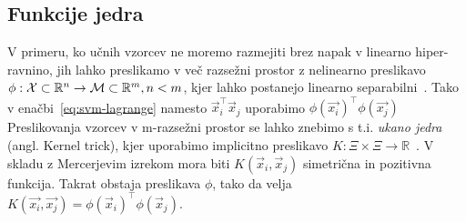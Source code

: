 \subsection{Funkcije jedra}
V primeru, ko učnih vzorcev ne moremo razmejiti brez napak v linearno hiper-ravnino, jih lahko preslikamo v več razsežni prostor z nelinearno preslikavo $\phi: \mathcal{X} \subset \mathbb{R}^n \to \mathcal{M} \subset \mathbb{R}^m, n < m$, kjer lahko postanejo linearno separabilni~\cite{chapelle1999support,boughorbel2005generalized}. Tako v enačbi~\eqref{eq:svm-lagrange} namesto $\vec{x}_i^\top\vec{x}_j$ uporabimo $\phi(\vec{x_i})^\top\phi(\vec{x_j})$ Preslikovanja vzorcev v m-razsežni prostor se lahko znebimo s t.i. \emph{ukano jedra} (angl. Kernel trick), kjer uporabimo implicitno preslikavo $K: \mathcal{\Xi} \times \mathcal{\Xi} \to \mathbb{R}$~\cite{boughorbel2005generalized}. V skladu z Mercerjevim izrekom mora biti $K(\vec{x}_i,\vec{x}_j)$ simetrična in pozitivna funkcija. Takrat obstaja preslikava $\phi$, tako da velja $K(\vec{x_i}, \vec{x_j}) = \phi(\vec{x}_i)^\top\phi(\vec{x}_j)$.


